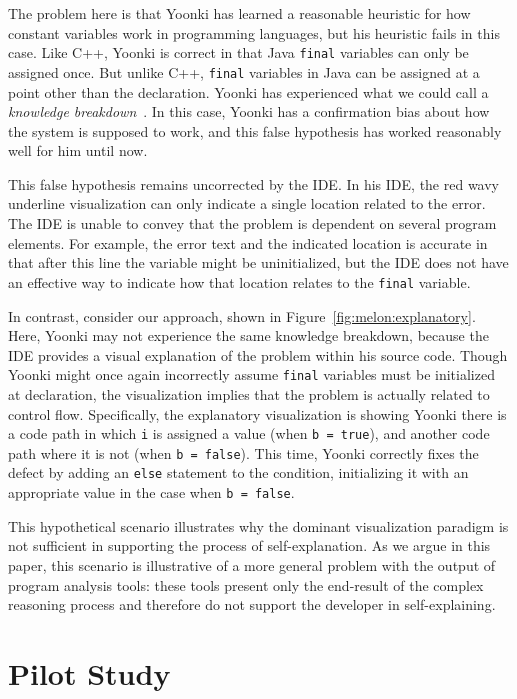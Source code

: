 \documentclass[conference]{IEEEtran}
\begin{document}
The problem here is that Yoonki has learned a reasonable heuristic for how constant variables work in programming languages, but his heuristic fails in this case. Like C++, Yoonki is correct in that Java \texttt{final} variables can only be assigned once. But unlike C++, \texttt{final} variables in Java can be assigned at a point other than the declaration. Yoonki has experienced what we could call a \textit{knowledge breakdown}~\cite{Ko2005}. In this case, Yoonki has a confirmation bias about how the system is supposed to work, and this false hypothesis has worked reasonably well for him until now.

This false hypothesis remains uncorrected by the IDE. In his IDE, the red wavy underline visualization can only indicate a single location related to the error. The IDE is unable to convey that the problem is dependent on several program elements. For example, the error text and the indicated location is accurate in that after this line the variable might be uninitialized, but the IDE does not have an effective way to indicate how that location relates to the \texttt{final} variable.

In contrast, consider our approach, shown in Figure~\ref{fig:melon:explanatory}. Here, Yoonki may not experience the same knowledge breakdown, because the IDE provides a visual explanation of the problem within his source code. Though Yoonki might once again incorrectly assume \texttt{final} variables must be initialized at declaration, the visualization implies that the problem is actually related to control flow. Specifically, the explanatory visualization is showing Yoonki there is a code path in which \texttt{i} is assigned a value (when \texttt{b = true}), and another code path where it is not (when \texttt{b = false}). This time, Yoonki correctly fixes the defect by adding an \texttt{else} statement to the condition, initializing it with an appropriate value in the case when \texttt{b = false}.

This hypothetical scenario illustrates why the dominant visualization paradigm is not sufficient in supporting the process of self-explanation. As we argue in this paper, this scenario is illustrative of a more general problem with the output of program analysis tools: these tools present only the end-result of the complex reasoning process and therefore do not support the developer in self-explaining.

\section{Pilot Study}
\label{sec:pilotstudy}
\end{document}
